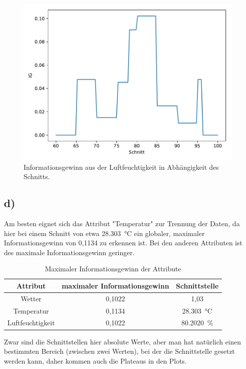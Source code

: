 \begin{figure}
  \centering
  \includegraphics[scale=0.7]{IG_Luft.pdf}
  \caption{Informationsgewinn aus der Luftfeuchtigkeit in Abhängigkeit des Schnitts.}
  \label{abb:3}
\end{figure}

\subsection{d)}
Am besten eignet sich das Attribut "Temperatur" zur Trennung der Daten, da
hier bei einem Schnitt von etwa \SI{28,303}{\celsius} ein globaler, maximaler
Informationsgewinn von 0,1134 zu erkennen ist. Bei den anderen
Attributen ist des maximale Informationsgewinn geringer.


\begin{table}
  \centering
  \caption{Maximaler Informationsgewinn der Attribute}
  \label{tab:1}
  \begin{tabular}{c c c}
    \toprule
    Attribut & maximaler Informationsgewinn & Schnittstelle \\
    \midrule
    Wetter & 0,1022 & 1,03 \\
    Temperatur & 0,1134 & \SI{28,303}{\celsius} \\
    Luftfeuchtigkeit & 0,1022 & \SI{80,2020}{\percent} \\
    \bottomrule
  \end{tabular}
\end{table}

Zwar sind die Schnittstellen hier absolute Werte, aber man hat natürlich
einen bestimmten Bereich (zwischen zwei Werten), bei der die Schnittstelle
gesetzt werden kann, daher kommen auch die Plateaus in den Plots.
